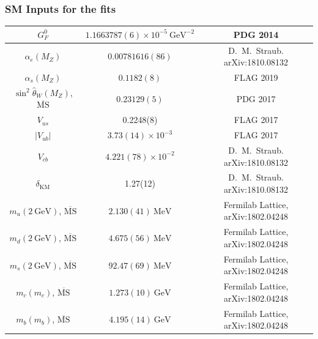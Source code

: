 \documentclass[mathserif, 10pt, dvipsnames]{beamer}
\newcommand\colorcite[1]{{\scriptsize\color{unizarblue}#1}}
\begin{document}
\begin{frame}\frametitle{SM Inputs for the fits}
\begin{table}
    \centering \scriptsize
    \renewcommand{\arraystretch}{1.3}
    \begin{tabular}{|c|c|c|}\hline
        $G_F^0$                                                & $1.1663787(6)\times 10^{-5}~\mathrm{GeV}^{-2}$ & \colorcite{PDG 2014}                            \\\hline
        $\alpha_e(M_Z)$                                        & $0.00781616(86)$                               & \colorcite{D.~M.~Straub. arXiv:1810.08132}      \\\hline
        $\alpha_s(M_Z)$                                        & $0.1182(8)$                                    & \colorcite{FLAG 2019}
        \\\hline
        $\sin^2 \hat{\theta}_W(M_Z)$, $\overline{\mathrm{MS}}$ & $0.23129(5)$                                   & \colorcite{PDG 2017}                            \\\hline
        $V_{us}$                                               & 0.2248(8)                                      & \colorcite{FLAG 2017}                           \\\hline
        $|V_{ub}|$                                             & $3.73(14)\times 10^{-3}$                       & \colorcite{FLAG 2017}                           \\\hline
        $V_{cb}$                                               & $4.221(78)\times 10^{-2}$                      & \colorcite{D.~M.~Straub. arXiv:1810.08132}      \\\hline
        $\delta_\mathrm{KM}$                                   & 1.27(12)                                       & \colorcite{D.~M.~Straub. arXiv:1810.08132}      \\\hline
        $m_u (2~\mathrm{GeV})$, $\overline{\mathrm{MS}}$       & $2.130(41)~\mathrm{MeV}$                       & \colorcite{ Fermilab Lattice, arXiv:1802.04248} \\\hline
        $m_d (2~\mathrm{GeV})$, $\overline{\mathrm{MS}}$       & $4.675(56)~\mathrm{MeV}$                       & \colorcite{ Fermilab Lattice, arXiv:1802.04248} \\\hline
        $m_s (2~\mathrm{GeV})$, $\overline{\mathrm{MS}}$       & $92.47(69)~\mathrm{MeV}$                       & \colorcite{ Fermilab Lattice, arXiv:1802.04248} \\\hline
        $m_c (m_c)$, $\overline{\mathrm{MS}}$                  & $1.273(10)~\mathrm{GeV}$                       & \colorcite{ Fermilab Lattice, arXiv:1802.04248} \\\hline
        $m_b (m_b)$, $\overline{\mathrm{MS}}$                  & $4.195(14)~\mathrm{GeV}$                       & \colorcite{ Fermilab Lattice, arXiv:1802.04248} \\\hline
    \end{tabular}
    \label{tab:tabSMinputs}
\end{table}
\end{frame}
\end{document}

